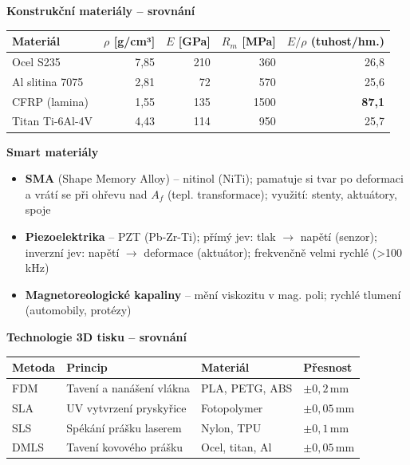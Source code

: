 \documentclass[a4paper,10pt]{article}
\begin{document}
\begin{vysvetlenibox}
\textbf{Konstrukční materiály -- srovnání}

\begin{center}
\begin{tabular}{@{} l r r r r @{}}
    \toprule
    \textbf{Materiál} & $\rho$ [g/cm³] & $E$ [GPa]
                      & $R_m$ [MPa] & $E/\rho$ (tuhost/hm.) \\
    \midrule
    Ocel S235       & 7,85 & 210 & 360 & 26,8 \\
    Al slitina 7075 & 2,81 & 72  & 570 & 25,6 \\
    CFRP (lamina)   & 1,55 & 135 & 1500 & \textbf{87,1} \\
    Titan Ti-6Al-4V & 4,43 & 114 & 950 & 25,7 \\
    \bottomrule
\end{tabular}
\end{center}

\textbf{Smart materiály}
\begin{itemize}[noitemsep, leftmargin=1.4em, topsep=4pt]
    \item \textbf{SMA} (Shape Memory Alloy) -- nitinol (NiTi); pamatuje si tvar
          po deformaci a vrátí se při ohřevu nad $A_f$ (tepl. transformace);
          využití: stenty, aktuátory, spoje
    \item \textbf{Piezoelektrika} -- PZT (Pb-Zr-Ti); přímý jev:
          tlak $\to$ napětí (senzor); inverzní jev: napětí $\to$ deformace
          (aktuátor); frekvenčně velmi rychlé (\textgreater100\,kHz)
    \item \textbf{Magnetoreologické kapaliny} -- mění viskozitu v mag. poli;
          rychlé tlumení (automobily, protézy)
\end{itemize}

\textbf{Technologie 3D tisku -- srovnání}

\begin{center}
\begin{tabularx}{0.95\linewidth}{@{} l X l l @{}}
    \toprule
    \textbf{Metoda} & \textbf{Princip} & \textbf{Materiál}
                    & \textbf{Přesnost} \\
    \midrule
    FDM  & Tavení a nanášení vlákna & PLA, PETG, ABS & $\pm0{,}2$\,mm \\
    SLA  & UV vytvrzení pryskyřice & Fotopolymer     & $\pm0{,}05$\,mm \\
    SLS  & Spékání prášku laserem  & Nylon, TPU      & $\pm0{,}1$\,mm \\
    DMLS & Tavení kovového prášku  & Ocel, titan, Al & $\pm0{,}05$\,mm \\
    \bottomrule
\end{tabularx}
\end{center}
\end{vysvetlenibox}
\end{document}
